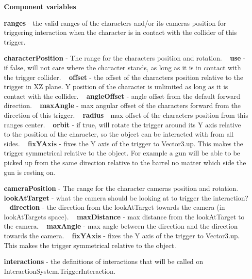{\bfseries Component variables}
\begin{DoxyItemize}
\item {\bfseries ranges} -\/ the valid ranges of the character\textquotesingle{}s and/or it\textquotesingle{}s camera\textquotesingle{}s position for triggering interaction when the character is in contact with the collider of this trigger.
\item {\bfseries character\+Position} -\/ The range for the character\textquotesingle{}s position and rotation. ~\newline
{\bfseries use} -\/ if false, will not care where the character stands, as long as it is in contact with the trigger collider. ~\newline
{\bfseries offset} -\/ the offset of the character\textquotesingle{}s position relative to the trigger in XZ plane. Y position of the character is unlimited as long as it is contact with the collider. ~\newline
{\bfseries angle\+Offset} -\/ angle offset from the default forward direction. ~\newline
{\bfseries max\+Angle} -\/ max angular offset of the character\textquotesingle{}s forward from the direction of this trigger. ~\newline
{\bfseries radius} -\/ max offset of the character\textquotesingle{}s position from this range\textquotesingle{}s center. ~\newline
{\bfseries orbit} -\/ if true, will rotate the trigger around it\textquotesingle{}s Y axis relative to the position of the character, so the object can be interacted with from all sides. ~\newline
{\bfseries fix\+Y\+Axis} -\/ fixes the Y axis of the trigger to Vector3.\+up. This makes the trigger symmetrical relative to the object. For example a gun will be able to be picked up from the same direction relative to the barrel no matter which side the gun is resting on.
\item {\bfseries camera\+Position} -\/ The range for the character camera\textquotesingle{}s position and rotation. ~\newline
{\bfseries look\+At\+Target} -\/ what the camera should be looking at to trigger the interaction? ~\newline
{\bfseries direction} -\/ the direction from the look\+At\+Target towards the camera (in look\+At\+Target\textquotesingle{}s space). ~\newline
{\bfseries max\+Distance} -\/ max distance from the look\+At\+Target to the camera. ~\newline
{\bfseries max\+Angle} -\/ max angle between the direction and the direction towards the camera. ~\newline
{\bfseries fix\+Y\+Axis} -\/ fixes the Y axis of the trigger to Vector3.\+up. This makes the trigger symmetrical relative to the object.
\item {\bfseries interactions} -\/ the definitions of interactions that will be called on Interaction\+System.\+Trigger\+Interaction.
\end{DoxyItemize}

  